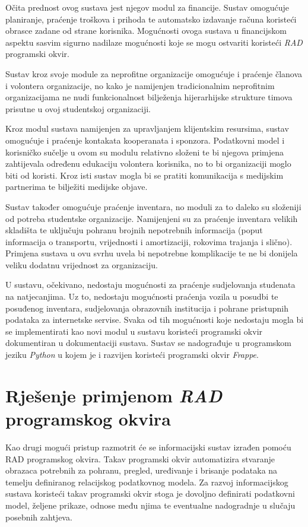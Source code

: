 \documentclass[times, utf8, diplomski]{fer}
\begin{document}
Očita prednost ovog sustava jest njegov modul za financije. Sustav
omogućuje planiranje, praćenje troškova i prihoda te automatsko izdavanje računa
koristeći obrasce zadane od strane korisnika. Mogućnosti ovoga sustava u
financijskom aspektu sasvim sigurno nadilaze mogućnosti koje se mogu ostvariti
koristeći \emph{RAD} programski okvir.

Sustav kroz svoje module za neprofitne organizacije omogućuje i praćenje članova
i volontera organizacije, no kako je namijenjen tradicionalnim neprofitnim
organizacijama ne nudi funkcionalnost bilježenja hijerarhijske strukture timova
prisutne u ovoj studentskoj organizaciji.

Kroz modul sustava namijenjen za upravljanjem klijentskim resursima, sustav
omogućuje i praćenje kontakata kooperanata i sponzora. Podatkovni model i
korisničko sučelje u ovom su modulu relativno složeni te bi njegova primjena
zahtijevala određenu edukaciju volontera korisnika, no to bi organizaciji moglo
biti od koristi. Kroz isti sustav mogla bi se pratiti komunikacija s medijskim
partnerima te bilježiti medijske objave.

Sustav također omogućuje praćenje inventara, no moduli za to daleko su
složeniji od potreba studentske organizacije. Namijenjeni su za praćenje
inventara velikih skladišta te uključuju pohranu brojnih nepotrebnih informacija
(poput informacija o transportu, vrijednosti i amortizaciji, rokovima trajanja i
slično). Primjena sustava u ovu svrhu uvela bi nepotrebne komplikacije te ne bi
donijela veliku dodatnu vrijednost za organizaciju.

U sustavu, očekivano, nedostaju mogućnosti za praćenje sudjelovanja studenata na
natjecanjima. Uz to, nedostaju mogućnosti praćenja vozila u posudbi te posuđenog
inventara, sudjelovanja obrazovnih institucija i pohrane pristupnih podataka za
internetske servise. Svaka od tih mogućnosti koje nedostaju mogla bi se
implementirati kao novi modul u sustavu koristeći programski okvir dokumentiran
u dokumentaciji sustava. Sustav se nadograđuje u programskom jeziku
\emph{Python} u kojem je i razvijen koristeći programski okvir \emph{Frappe}.

\chapter{Rješenje primjenom \emph{RAD} programskog okvira}
Kao drugi mogući pristup razmotrit će se informacijski sustav izrađen pomoću RAD
 programskog okvira. Takav programski okvir
automatizira stvaranje obrazaca potrebnih za pohranu, pregled, uređivanje i
brisanje podataka  na temelju definiranog relacijskog podatkovnog
modela. Za razvoj informacijskog sustava koristeći takav programski okvir stoga
je dovoljno definirati podatkovni model, željene prikaze, odnose među njima te
eventualne nadogradnje u slučaju posebnih zahtjeva.
\end{document}

